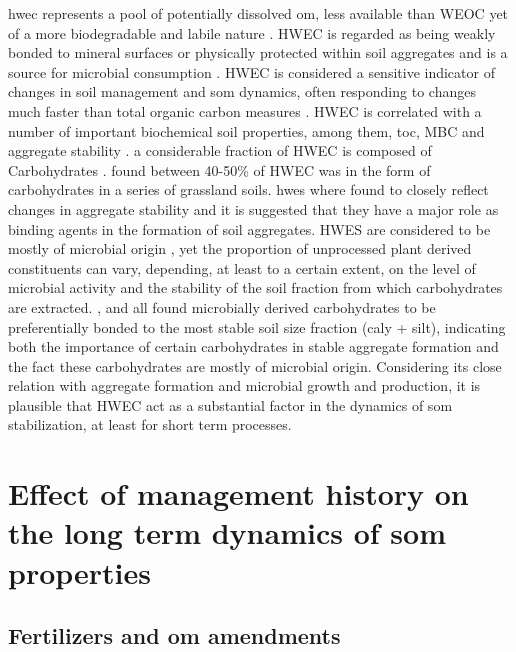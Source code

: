 \documentclass[12pt]{report}
\begin{document}
		\gls{hwec} represents a pool of potentially dissolved \gls{om}, less available than WEOC yet of a more biodegradable and labile nature \citep{chantigny2014, leinweber1995, gregorich2003}. HWEC is regarded as being weakly bonded to mineral surfaces or physically protected within soil aggregates and is a source for microbial consumption \citep{zakharova2015, leinweber1995}.
		HWEC is considered a  sensitive indicator of changes in soil management and \gls{som} dynamics, often responding to changes much faster than total organic carbon measures \citep{ghani2003}. HWEC is correlated with a number of important biochemical soil properties, among them, \gls{toc}, MBC and aggregate stability \citep{hamkalo2014}.
		a considerable fraction of HWEC is composed of Carbohydrates \citep{leinweber1995, balaria2009}. \citet{ghani2003} found between 40-50\% of HWEC was in the form of carbohydrates in a series of grassland soils.
		\gls{hwes} where found to  closely reflect changes in aggregate stability \citep{haynes2005, yousefi2008, leguillou2012} and it is suggested that they have a major role as binding agents in the formation of soil aggregates.
		HWES are considered to be mostly of microbial origin \citep{haynes1993, debosz2002}, yet the proportion of unprocessed plant derived constituents can vary, depending, at least to a certain extent, on the level of microbial activity and the stability of the soil fraction from which carbohydrates are extracted. \citet{puget1998}, \citet{jolivet2006} and \citet{bock2007} all found microbially derived carbohydrates to be preferentially bonded to the most stable soil size fraction (caly + silt), indicating both the importance of certain  carbohydrates in stable aggregate formation and the fact these carbohydrates are mostly of microbial origin.
		Considering its close relation with aggregate formation and microbial growth and production, it is plausible that HWEC act as a substantial factor in  the dynamics of \gls{som} stabilization, at least for short term processes.
		
		\section{Effect of management history on the long term dynamics of \gls{som} properties}
		
		\subsection{Fertilizers and \gls{om} amendments}
		
\end{document}
